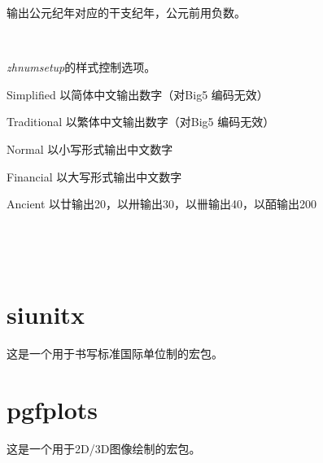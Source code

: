 输出公元纪年对应的干支纪年，公元前用负数。

\begin{codeshow}
 \\
\zhganzhinian{\year}
\end{codeshow}

\emph{zhnumsetup}的样式控制选项。

\begin{asparadesc}
	\item [Simplified] 以简体中文输出数字（对Big5 编码无效）
	\item [Traditional] 以繁体中文输出数字（对Big5 编码无效）
	\item [Normal] 以小写形式输出中文数字
	\item [Financial] 以大写形式输出中文数字
	\item [Ancient] 以廿输出20，以卅输出30，以卌输出40，以皕输出200
\end{asparadesc}

\begin{codeshow}
\\
\end{codeshow}

\begin{codeshow}
\\
\end{codeshow}


\section{siunitx}
这是一个用于书写标准国际单位制的宏包。

\section{pgfplots}
这是一个用于2D/3D图像绘制的宏包。
















